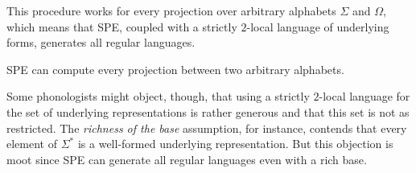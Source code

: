 This procedure works for every projection over arbitrary alphabets $\Sigma$ and $\Omega$, which means that SPE, coupled with a strictly $2$-local language of underlying forms, generates all regular languages.
%
\begin{lemma}
    SPE can compute every projection between two arbitrary alphabets.
\end{lemma}
%
Some phonologists might object, though, that using a strictly $2$-local language for the set of underlying representations is rather generous and that this set is not as restricted.
The \emph{richness of the base} assumption, for instance, contends that every element of $\Sigma^*$ is a well-formed underlying representation.
But this objection is moot since SPE can generate all regular languages even with a rich base.

